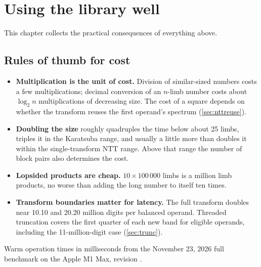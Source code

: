 \chapter{Using the library well}
\label{ch:practice}

This chapter collects the practical consequences of everything above.

\section{Rules of thumb for cost}

\begin{itemize}
  \item \textbf{Multiplication is the unit of cost.} Division of similar-sized numbers costs a few
        multiplications; decimal conversion of an $n$-limb number costs about $\log_2 n$
        multiplications of decreasing size. The cost of a square depends on whether the
        transform reuses the first operand's spectrum (\cref{sec:nttreuse}).
  \item \textbf{Doubling the size} roughly quadruples the time below about 25 limbs, triples it in
        the Karatsuba range, and usually a little more than doubles it within the single-transform
        NTT range. Above that range the number of block pairs also determines the cost.
  \item \textbf{Lopsided products are cheap.} $10 \times 100\,000$ limbs is a million limb products,
        no worse than adding the long number to itself ten times.
  \item \textbf{Transform boundaries matter for latency.} The full transform
        doubles near 10.10 and 20.20 million digits per balanced operand.
        Threaded truncation covers the first quarter of each new band for
        eligible operands, including the 11-million-digit case
        (\cref{sec:trunc}).
\end{itemize}

Warm operation times in milliseconds from the November 23, 2026 full benchmark
on the Apple M1 Max, revision .

